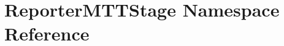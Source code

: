 \hypertarget{namespaceReporterMTTStage}{\section{Reporter\-M\-T\-T\-Stage Namespace Reference}
\label{namespaceReporterMTTStage}
}
